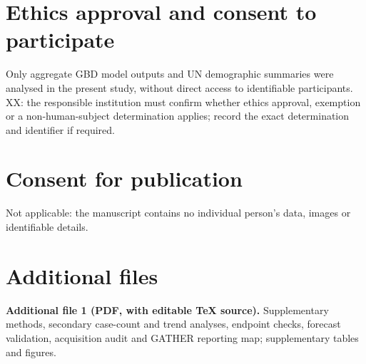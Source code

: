 \documentclass[11pt,a4paper]{article}
\begin{document}
\section*{Ethics approval and consent to participate}
Only aggregate GBD model outputs and UN demographic summaries were analysed in the present study, without direct access to identifiable participants. XX: the responsible institution must confirm whether ethics approval, exemption or a non-human-subject determination applies; record the exact determination and identifier if required.

\section*{Consent for publication}
Not applicable: the manuscript contains no individual person's data, images or identifiable details.

\section*{Additional files}
\textbf{Additional file 1 (PDF, with editable TeX source).} Supplementary methods, secondary case-count and trend analyses, endpoint checks, forecast validation, acquisition audit and GATHER reporting map; supplementary tables and figures.
\end{document}

